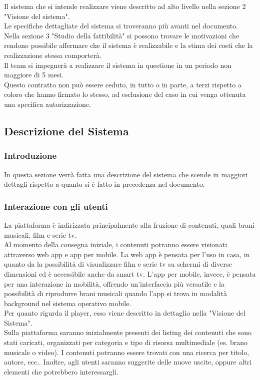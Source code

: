Il sistema che si intende realizzare viene descritto ad alto livello nella sezione 2 "Visione del sistema".\\
Le specifiche dettagliate del sistema si troveranno più avanti nel documento.\\
Nella sezione 3 "Studio della fattibilità" si possono trovare le motivazioni che rendono possibile affermare che
il sistema è realizzabile e la stima dei costi che la realizzazione stessa comporterà.\\
Il team si impegnerà a realizzare il sistema in questione in un periodo non maggiore di 5 mesi.\\
Questo contratto non può essere ceduto, in tutto o in parte, a terzi rispetto a coloro che hanno firmato lo stesso, ad esclusione del caso in cui venga ottenuta una specifica autorizzazione.


\subsection{Descrizione del Sistema}

\subsubsection{Introduzione}
In questa sezione verrà fatta una descrizione del sistema che scende in maggiori dettagli rispetto a quanto
si è fatto in precedenza nel documento.

\subsubsection{Interazione con gli utenti}
La piattaforma è indirizzata principalmente alla fruzione di contenuti, quali brani musicali, film e serie tv.\\
Al momento della consegna iniziale, i contenuti potranno essere visionati attraverso web app e app per mobile.
La web app è pensata per l'uso in casa, in quanto da la possibilità di visualizzare film e serie tv su schermi
di diverse dimensioni ed è accessibile anche da smart tv. L'app per mobile, invece, è pensata per una
interazione in mobilità, offrendo un'interfaccia più versatile e la possibilità di riprodurre brani musicali
quando l'app si trova in modalità background nel sistema operativo mobile.\\
Per quanto rigurda il player, esso viene descritto in dettaglio nella "Visione del Sistema".\\
Sulla piattaforma saranno inizialmente presenti dei listing dei contenuti che sono stati caricati, organizzati per 
categoria e tipo di risorsa multimediale (es. brano musicale o video). I contenuti potranno essere trovati
con una ricerca per titolo, autore, ecc.. Inoltre, agli utenti saranno suggerite delle nuove uscite,
oppure altri elementi che potrebbero interessargli.\\

